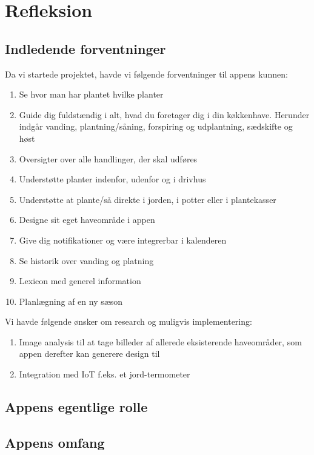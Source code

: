 \section{Refleksion}

\subsection{Indledende forventninger}
Da vi startede projektet, havde vi følgende forventninger til appens kunnen:

\begin{enumerate}
    \item Se hvor man har plantet hvilke planter
    \item Guide dig fuldstændig i alt, hvad du foretager dig i din køkkenhave. Herunder indgår vanding, plantning/såning, forspiring og udplantning, sædskifte og høst
    \item Oversigter over alle handlinger, der skal udføres
    \item Understøtte planter indenfor, udenfor og i drivhus
    \item Understøtte at plante/så direkte i jorden, i potter eller i plantekasser
    \item Designe sit eget haveområde i appen
    \item Give dig notifikationer og være integrerbar i kalenderen
    \item Se historik over vanding og platning
    \item Lexicon med generel information
    \item Planlægning af en ny sæson
\end{enumerate}

\noindent Vi havde følgende ønsker om research og muligvis implementering:

\begin{enumerate}
    \item Image analysis til at tage billeder af allerede eksisterende haveområder, som appen derefter kan generere design til
    \item Integration med IoT f.eks. et jord-termometer
\end{enumerate}

\subsection{Appens egentlige rolle}

\subsection{Appens omfang}

